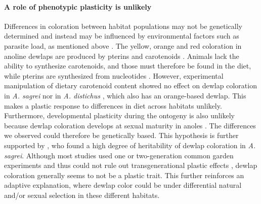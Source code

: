 \paragraph{A role of phenotypic plasticity is unlikely} Differences in coloration between habitat populations may not be genetically determined and instead may be influenced by environmental factors such as parasite load, as mentioned above \citep{Cook2013}. The yellow, orange and red coloration in anoline dewlaps are produced by pterins and carotenoids \citep{Ortiz1962, Ortiz1962a, Ortiz1963, Ortiz1966, Macedonia2000, Steffen2007, Steffen2009}. Animals lack the ability to synthesize carotenoids, and those must therefore be found in the diet, while pterins are synthesized from nucleotides \citep{Goodwin1984, Hill2002, Hill2006}. However, experimental manipulation of dietary carotenoid content showed no effect on dewlap coloration in \textit{A. sagrei} \citep{Steffen2010} nor in \textit{A. distichus} \citep{Ng2013}, which also has an orange-based dewlap. This makes a plastic response to differences in diet across habitats unlikely. Furthermore, developmental plasticity during the ontogeny is also unlikely because dewlap coloration develops at sexual maturity in anoles \citep{Ng2013}. The differences we observed could therefore be genetically based. This hypothesis is further supported by \citet{Cox2017}, who found a high degree of heritability of dewlap coloration in \textit{A. sagrei}. Although most studies used one or two-generation common garden experiments and thus could not rule out transgenerational plastic effects \citep{Tariel2020}, dewlap coloration generally seems to not be a plastic trait. This further reinforces an adaptive explanation, where dewlap color could be under differential natural and/or sexual selection in these different habitats.\\


